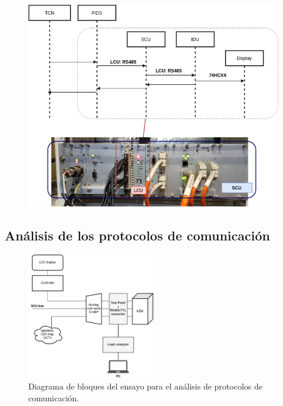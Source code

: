 \documentclass[
11pt, %
]{charter}
\begin{document}
\begin{figure}[htpb]
\centering 
\includegraphics[width=1\textwidth]{./Pics/processDiagram.map.png}
\caption{}
\label{fig:Placa de control map}
\end{figure}


\pagebreak
\subsection{Análisis de los protocolos de comunicación}

\begin{figure}[htpb]
\centering 
\includegraphics[width=0.5\textwidth]{./Pics/sniffingDiagram.drawio.png}
\caption{Diagrama de bloques del ensayo para el análisis de protocolos de comunicación.}
\label{fig:sniffingDiagram}
\end{figure}
\end{document}
